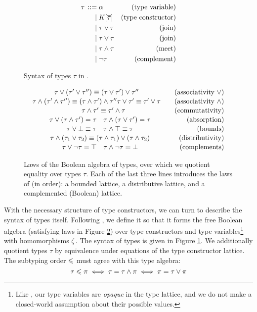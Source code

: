 \begin{figure}
    \centering
    \begin{align*}
    {\tau} \,::=&\; 
             \alpha & \text{(type variable)}
    \\ \mid&\; K[\overline \tau] & \text{(type constructor)}
    \\ \mid&\; \tau \lor \tau & \text{(join)}
    \\ \mid&\; \tau \lor \tau & \text{(join)}
    \\ \mid&\; \tau \land \tau & \text{(meet)}
    \\ \mid&\; \lnot \tau & \text{(complement)}
    \end{align*}
    \caption{Syntax of types $\tau$ in \inference{}.}
    \label{fig:types}
\end{figure}

\begin{figure}
    \centering
    $$ \renewcommand\arraystretch{1.1} \begin{array}{cr}
    \tau \join (\tau' \join \tau'') \equiv (\tau \join \tau') \join \tau'' \quad 
    & \text{(associativity \mbox{$\join$})}
    \\
    \tau \meet (\tau' \meet \tau'') \equiv (\tau \meet \tau') \meet \tau''
    \tau \join \tau' \equiv \tau' \join \tau  \quad 
    & \text{(associativity \mbox{$\meet$})} 
    \\
    \quad
    \tau \meet \tau' \equiv \tau' \meet \tau 
    & \text{(commutativity)}
    \\
    \tau \join (\tau \meet \tau') = \tau
    \quad 
    \tau \meet (\tau \join \tau') = \tau
    & \text{(absorption)}
    \\ 
    \tau \join \bot \equiv \tau
    \quad 
    \tau \meet \top \equiv \tau 
    & \text{(bounds)} 
    \\
    \tau \meet (\tau_1 \join \tau_2) \equiv (\tau \meet \tau_1) \join (\tau \meet \tau_2)
    & \text{(distributivity)}
    \\
    \tau \join \comp \tau = \top 
    \quad
    \tau \meet \comp \tau = \bot
    & \text{(complements)}
    \end{array} $$
    \caption{Laws of the Boolean algebra of types, over which we quotient equality over types $\tau$. Each of the last three lines introduces the laws of (in order): a bounded lattice, a distributive lattice, and a complemented (Boolean) lattice.}
    \label{fig:boolean-laws}
\end{figure}

With the necessary structure of type constructors, we can turn to describe the syntax of types itself. Following \textcite{mlstruct}, we define it so that it forms the free Boolean algebra (satisfying laws in Figure \ref{fig:boolean-laws}) over type constructors and type variables\footnote{Like \textcite{dolan-thesis}, our type variables are \emph{opaque} in the type lattice, and we do not make a closed-world assumption about their possible values.} with homomorphisms $\zeta$. The syntax of types is given in Figure \ref{fig:types}. We additionally quotient types $\tau$ by equivalence under equations of the type constructor lattice.  
The subtyping order $\leqslant$ must agree with this type algebra:
$$ \tau \leqslant \pi \iff \tau = \tau \land \pi \iff \pi = \tau \lor \pi $$

